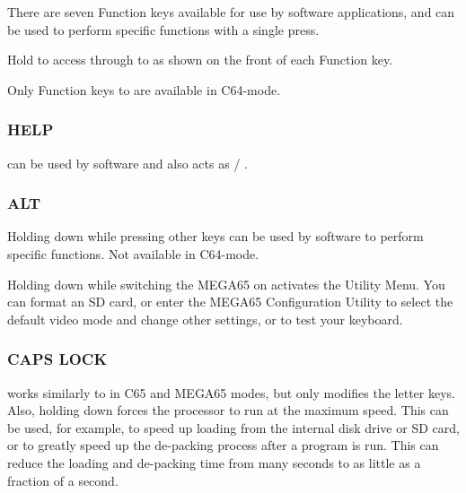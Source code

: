 There are seven Function keys available for use by software applications,       and  can be used to perform specific functions with a single press.

Hold  to access  through to  as shown on the front of each Function key.

Only Function keys  to  are available in C64-mode.

\subsubsection{HELP}

 can be used by software and also acts as  / .

\subsubsection{ALT}

Holding  down while pressing other keys can be used by software to perform specific functions. Not available in C64-mode.

Holding  down while switching the MEGA65 on activates the Utility Menu. You can format an SD card, or enter the MEGA65 Configuration Utility to select the default video mode and change other settings, or to test your keyboard.

\subsubsection{CAPS LOCK}

 works similarly to  in C65 and MEGA65 modes, but only modifies the letter keys.
Also, holding  down forces the processor to run at the maximum speed. This can be used, for example,
to speed up loading from the internal disk drive or SD card, or to greatly speed up the de-packing process after a program is run.
This can reduce the loading and de-packing time from many seconds to as little as a fraction of a second.
